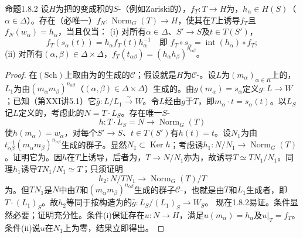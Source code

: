 \begin{SGAresult}{命题}{1.8.2}
设$H$为把的变成积的$S$-（例如Zariski的），$f_T:T\to H$为，$h_\alpha\in H(S)$（$\alpha\in\Delta$）。存在（必唯一）$f_N:\operatorname{Norm}_G(T)\to H$，使其在$T$上诱导$f_T$且$f_N(w_\alpha)=h_\alpha$，当且仅当：
(i) 对所有$\alpha\in\Delta$、$S'\to S$及$t\in T(S')$，
\[f_T(s_\alpha(t))=h_\alpha f_T(t)h_\alpha^{-1}\quad\text{即 }f_T\circ s_\alpha=\operatorname{int}(h_\alpha)\circ f_T;\]
(ii) 对所有$(\alpha,\beta)\in\Delta\times\Delta$，$f_T(t_{\alpha\beta})=(h_\alpha h_\beta)^{n_{\alpha\beta}}$。
\end{SGAresult}
\begin{proof}
在$(\mathrm{Sch})$上取由为的生成的$\mathcal C$；假设就是$H$为$\mathcal C$-。设$L$为$(m_\alpha)_{\alpha\in R}$上的，$L_1$为由$(m_\alpha m_\beta)^{n_{\alpha\beta}}$（$(\alpha,\beta)\in\Delta\times\Delta$）生成的。由$g(m_\alpha)=s_\alpha$定义$g:L\to W$；已知（第XXI讲5.1）它$\bar g:L/L_1\xrightarrow\sim W$。令$L$经由$g$于$T$，即$m_\alpha\cdot t=s_\alpha(t)$。以$L_S$记$L$定义的，考虑此的$N=T\cdot L_S$。存在唯一$S$-
\[h:T\cdot L_S=N\longrightarrow\operatorname{Norm}_G(T)\]
使$h(m_\alpha)=w_\alpha$，对每个$S'\to S$、$t\in T(S')$有$h(t)=t$。设$N_1$为由$t_{\alpha\beta}^{-1}(m_\alpha m_\beta)^{n_{\alpha\beta}}$生成的群子。显然$N_1\subset\operatorname{Ker}h$；考虑诱$h_1:N/N_1\to\operatorname{Norm}_G(T)$。证明它为。因$h$在$T$上诱导，后者为，$T\to N/N_1$亦为，故诱导$T\simeq TN_1/N_1$。同理$h_1$诱导$TN_1/N_1\simeq T$；只须证明
\[h_2:N/TN_1\longrightarrow\operatorname{Norm}_G(T)/T\]
为。但$TN_1$是$N$中由$T$和$(m_\alpha m_\beta)^{n_{\alpha\beta}}$生成的群子$\mathcal C$-，也就是由$T$和$L_1$生成者，即$T\cdot(L_1)_S$。故$h_2$等同于按构造为的$\bar g:L_S/(L_1)_S\to W_S$。
现在1.8.2易证。条件显然必要；证明充分性。条件(i)保证存在$u:N\to H$，满足$u(m_\alpha)=h_\alpha$及$u|_T=f_T$。条件(ii)说$u$在$N_1$上为零，结果立即得出。
\end{proof}
